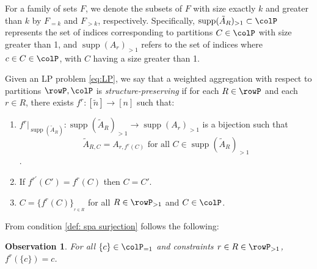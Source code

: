 \documentclass[smallextended,natbib]{svjour3}       %
\newtheorem{observation}[theorem]{Observation}
\DeclareMathOperator{\supp}{supp}
\numberwithin{theorem}{section}
\begin{document}
For a family of sets \(F\), we denote the subsets of \(F\) with size exactly \(k\) and greater than \(k\) 
by \(F_{=k}\) and \(F_{>k}\), respectively. 
Specifically, \(\supp(\tilde{A}_R)_{>1} \subset \colP\) represents the set of indices corresponding to partitions 
\(C \in \colP\) with size greater than 1, and \(\supp(A_r)_{>1}\) refers to the set of indices where 
\(c \in C \in \colP\), with \(C\) having a size greater than 1.

\begin{definition}

  \label{def:structure preserving aggregation}
  Given an LP problem \eqref{eq:LP}, we say that a weighted aggregation with respect to partitions \(\rowP, \colP\) is \emph{structure-preserving} if for each \(R \in \rowP\) and each \(r \in R\), there exists \(f^r: [\tilde{n}] \to [n]\)  such that:
  \begin{enumerate}
    \item \label{def:spa bijection}\( f^r|_{\supp(\tilde{A}_{R})}: \supp(\tilde{A}_{R})_{>1} \to \supp(A_{r})_{>1}\) is a bijection such that
    \[\tilde{A}_{R,C} = A_{r,f^r(C)} \text{ for all } C \in \supp(\tilde{A}_{R})_{>1}\].
    \item \label{def: spa injection} If \(f^{r'}(C') = f^r(C)\) then \( C=C'\).
    \item \label{def: spa surjection} \(C = \{f^r(C)\}_{_{r\in R}}\) for all \(R \in \rowP_{>1}\) and \(C \in \colP\). %
  \end{enumerate}
\end{definition}
From condition \ref{def: spa surjection} follows the following:
\begin{observation}
  For all \(\{c\}\in \colP_{=1}\) and constraints \(r \in R \in \rowP_{>1}\), \(f^r(\{c\})= c\).
\end{observation}
\end{document}
